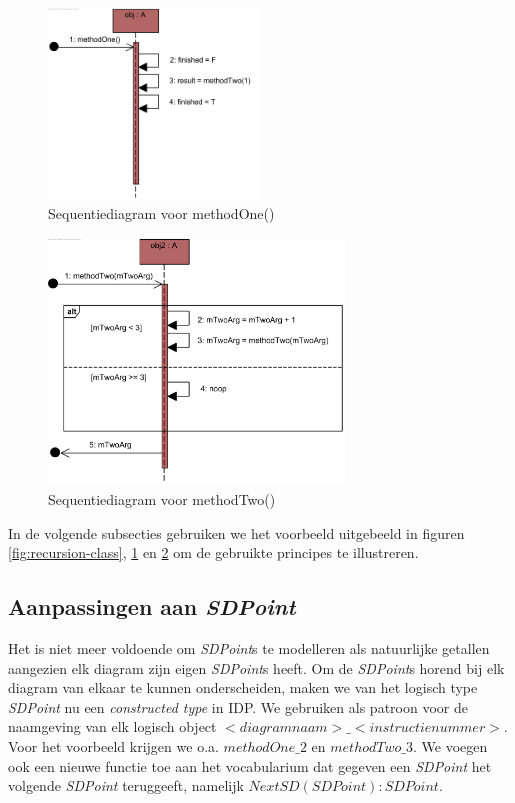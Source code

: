 \begin{figure}[htp]
	\centering
	\includegraphics[width=0.5\textwidth]{chap-gedrag/methodOne.png}
	\caption{Sequentiediagram voor methodOne()}
	\label{fig:methodOne}
\end{figure}%

\begin{figure}[htp]
	\centering
	\includegraphics[width=0.7\textwidth]{chap-gedrag/methodTwo.png}
	\caption{Sequentiediagram voor methodTwo()}
	\label{fig:methodtwo}
\end{figure}

In de volgende subsecties gebruiken we het voorbeeld uitgebeeld in figuren \ref{fig:recursion-class}, \ref{fig:methodOne} en \ref{fig:methodtwo} om de gebruikte principes te illustreren.

\subsection{Aanpassingen aan \textit{SDPoint}}
Het is niet meer voldoende om \textit{SDPoint}s te modelleren als natuurlijke getallen aangezien elk diagram zijn eigen \textit{SDPoint}s heeft. Om de \textit{SDPoint}s horend bij elk diagram van elkaar te kunnen onderscheiden, maken we van het logisch type \textit{SDPoint} nu een \textit{constructed type} in IDP. We gebruiken als patroon voor de naamgeving van elk logisch object $<diagramnaam>\_<instructienummer>$. Voor het voorbeeld krijgen we o.a. $methodOne\_2$ en $methodTwo\_3$. We voegen ook een nieuwe functie toe aan het vocabularium dat gegeven een \textit{SDPoint} het volgende \textit{SDPoint} teruggeeft, namelijk $NextSD(SDPoint) : SDPoint$.

